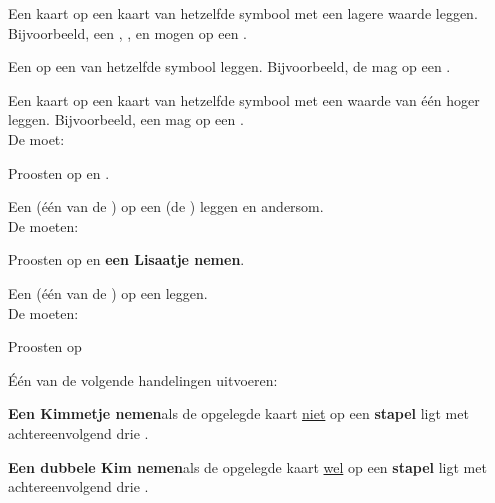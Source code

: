 \newpage
{}

\label{hoofdstuk:zettenLang}


\item Een kaart op een kaart van hetzelfde symbool met een lagere waarde leggen. Bijvoorbeeld, een , ,  en  mogen op een .
\label{zet:hoger}
\eindLijst{}

\vervolgLijstKlein{}
\item Een  op een  van hetzelfde symbool leggen. Bijvoorbeeld, de  mag op een .
\eindLijst{}

\vervolgLijstKlein{}
\item Een kaart op een kaart van hetzelfde symbool met een waarde van \'e\'en hoger leggen. Bijvoorbeeld, een  mag op een . \\De \huidigeSpeler moet:
\puntLijst{}
\item Proosten op  en \FritsenN\footnotemark[1].
\eindPuntLijst{}
\label{zet:offer_frits}
\eindLijst{}

\vervolgLijstKlein{}
\item \label{zet:lisa} Een  (\'e\'en van de ) op een  (de ) leggen en andersom. \\ De \andereSpelers moeten:
\puntLijst{}
\item Proosten op  en \textbf{een Lisaatje nemen}\footnotemark[2].
\eindPuntLijst{}
\eindLijst{}

\vervolgLijstKlein{}
\item \label{zet:kim} Een  (\'e\'en van de ) op een  leggen. \\De \andereSpelers moeten:
\puntLijst{}
\item Proosten op 
\item Één van de volgende handelingen uitvoeren:
\numeriekeLijst{}
\item \textbf{Een Kimmetje nemen}\footnotemark[3] als de opgelegde kaart \ul{niet} op een \textbf{stapel} ligt met \\achtereenvolgend drie .
\item \textbf{Een dubbele Kim nemen}\footnotemark[4] als de opgelegde kaart \ul{wel} op een \textbf{stapel} ligt met \\achtereenvolgend drie .
\eindNumeriekeLijst{}
\eindPuntLijst{}
\eindLijst{}

